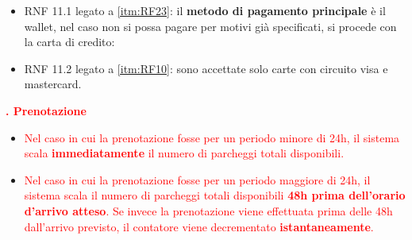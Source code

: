 \begin{itemize}
    \item RNF 11.1 legato a \ref{itm:RF23}: il \textbf{metodo di pagamento principale} è il wallet, nel caso non si possa pagare per motivi già specificati, si procede con la carta di credito:
    \item RNF 11.2 legato a \ref{itm:RF10}: sono accettate solo carte con circuito visa e mastercard.
\end{itemize}
\textbf{\textcolor{red}{. Prenotazione}}
\begin{itemize}
    \item \textcolor{red}{Nel caso in cui la prenotazione fosse per un periodo minore di 24h, il sistema scala \textbf{immediatamente} il numero di parcheggi totali disponibili.}
    \item \textcolor{red}{Nel caso in cui la prenotazione fosse per un periodo maggiore di 24h, il sistema scala il numero di parcheggi totali disponibili \textbf{48h prima dell'orario d'arrivo atteso}. Se invece la prenotazione viene effettuata prima delle 48h dall'arrivo previsto, il contatore viene decrementato \textbf{istantaneamente}.}
\end{itemize}